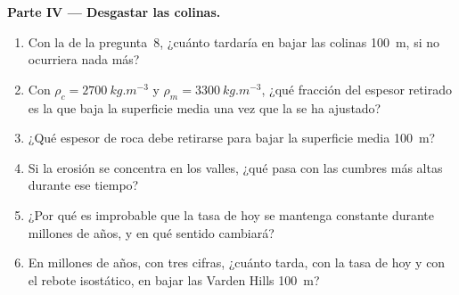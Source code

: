 \begin{problem}
\medskip
\noindent\textbf{Parte IV --- Desgastar las colinas.}
\begin{enumerate}[resume]
  \item Con la  de la pregunta~8, ¿cuánto tardaría en bajar las colinas \qty{100}{m}, si no ocurriera nada más?
  \item Con $\rho_c = \qty{2700}{kg.m^{-3}}$ y $\rho_m =
        \qty{3300}{kg.m^{-3}}$, ¿qué fracción del espesor retirado es la que baja la superficie media una vez que la  se ha ajustado?
  \item ¿Qué espesor de roca debe retirarse para bajar la superficie media \qty{100}{m}?
  \item Si la erosión se concentra en los valles, ¿qué pasa con las cumbres más altas durante ese tiempo?
  \item ¿Por qué es improbable que la tasa de hoy se mantenga constante durante millones de años, y en qué sentido cambiará?
  \item En millones de años, con tres cifras, ¿cuánto tarda, con la tasa de hoy y con el rebote isostático, en bajar las Varden Hills \qty{100}{m}?
\end{enumerate}
\end{problem}
